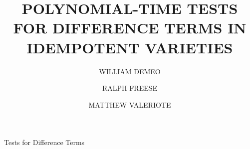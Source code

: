\documentclass{ws-ijac}
\begin{document}
{Tests for Difference Terms}

%
\catchline{}{}{}{}{}
%

\title{POLYNOMIAL-TIME TESTS FOR DIFFERENCE TERMS IN IDEMPOTENT VARIETIES}

\author{WILLIAM DEMEO}
\address{Mathematics Department, University of Colorado\\Boulder, Colorado 80309, USA\\
}

\author{RALPH FREESE}
\address{Mathematics Department, University of Hawaii\\Honolulu, Hawaii 96822, USA\\
}

\author{MATTHEW VALERIOTE}
\address{Mathematics Department, McMaster University\\Hamilton, Ontario L8S 4K1, CAN\\
}


\maketitle
\end{document}
